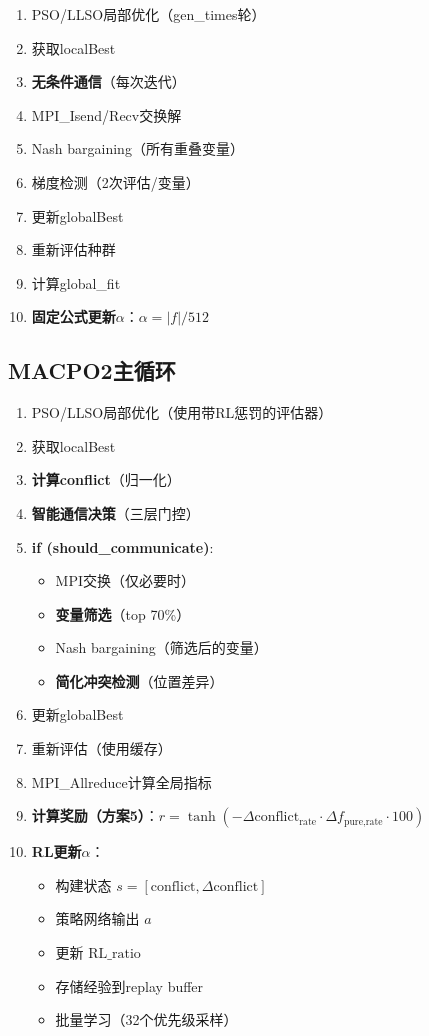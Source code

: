 \documentclass[15pt,a3paper]{ctexart}
\begin{document}
\begin{enumerate}
    \item PSO/LLSO局部优化（gen\_times轮）
    \item 获取localBest
    \item \textbf{无条件通信}（每次迭代）
    \item MPI\_Isend/Recv交换解
    \item Nash bargaining（所有重叠变量）
    \item 梯度检测（2次评估/变量）
    \item 更新globalBest
    \item 重新评估种群
    \item 计算global\_fit
    \item \textbf{固定公式更新}$\alpha$：$\alpha = |f| / 512$
\end{enumerate}

\subsection{MACPO2主循环}

\begin{enumerate}
    \item PSO/LLSO局部优化（使用带RL惩罚的评估器）
    \item 获取localBest
    \item \textbf{计算conflict}（归一化）
    \item \textbf{智能通信决策}（三层门控）
    \item \textbf{if (should\_communicate)}:
    \begin{itemize}
        \item MPI交换（仅必要时）
        \item \textbf{变量筛选}（top 70\%）
        \item Nash bargaining（筛选后的变量）
        \item \textbf{简化冲突检测}（位置差异）
    \end{itemize}
    \item 更新globalBest
    \item 重新评估（使用缓存）
    \item MPI\_Allreduce计算全局指标
    \item \textbf{计算奖励（方案5）}：$r = \tanh\!\left(-\Delta\text{conflict}_{\text{rate}} \cdot \Delta f_{\text{pure,rate}} \cdot 100\right)$
    \item \textbf{RL更新}$\alpha$：
    \begin{itemize}
        \item 构建状态 $s = [\text{conflict}, \Delta\text{conflict}]$
        \item 策略网络输出 $a$
        \item 更新 $\text{RL\_ratio}$
        \item 存储经验到replay buffer
        \item 批量学习（32个优先级采样）
    \end{itemize}
\end{enumerate}
\end{document}
